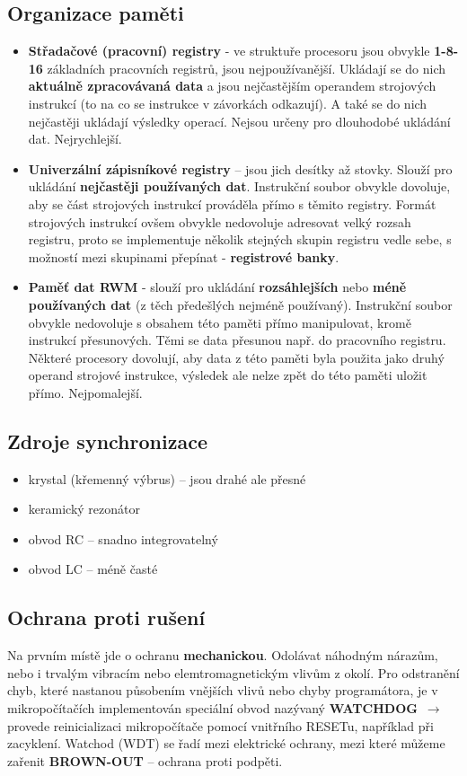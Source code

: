 \subsection*{Organizace paměti}
\begin{itemize}
	\item \textbf{Střadačové (pracovní) registry }- ve struktuře procesoru jsou obvykle \textbf{1-8-16} základních pracovních registrů, jsou nejpoužívanější. Ukládají se do nich \textbf{aktuálně zpracovávaná data} a jsou nejčastějším operandem strojových instrukcí (to na co se instrukce v závorkách odkazují). A také se do nich nejčastěji ukládají výsledky operací. Nejsou určeny pro dlouhodobé ukládání dat. Nejrychlejší.
	\item \textbf{Univerzální zápisníkové registry} – jsou jich desítky až stovky. Slouží pro ukládání \textbf{nejčastěji používaných dat}. Instrukční soubor obvykle dovoluje, aby se část strojových instrukcí prováděla přímo s těmito registry. Formát strojových instrukcí ovšem obvykle nedovoluje adresovat velký rozsah registru, proto se implementuje několik stejných skupin registru vedle sebe, s možností mezi skupinami přepínat - \textbf{registrové banky}.
	\item \textbf{Paměť dat RWM }- slouží pro ukládání \textbf{rozsáhlejších} nebo \textbf{méně používaných dat} (z těch předešlých nejméně používaný). Instrukční soubor obvykle nedovoluje s obsahem této paměti přímo manipulovat, kromě instrukcí přesunových. Těmi se data přesunou např. do pracovního registru. Některé procesory dovolují, aby data z této paměti byla použita jako druhý operand strojové instrukce, výsledek ale nelze zpět do této paměti uložit přímo. Nejpomalejší.
\end{itemize}

\subsection*{Zdroje synchronizace}
\begin{itemize}
	\item krystal (křemenný výbrus) – jsou drahé ale přesné
	\item keramický rezonátor
	\item obvod RC – snadno integrovatelný
	\item obvod LC – méně časté
\end{itemize}

\subsection*{Ochrana proti rušení}
Na prvním místě jde o ochranu \textbf{mechanickou}. Odolávat náhodným nárazům, nebo i trvalým vibracím nebo elemtromagnetickým vlivům z okolí. Pro odstranění chyb, které nastanou působením vnějších vlivů nebo chyby programátora, je v mikropočítačích implementován speciální obvod nazývaný \textbf{WATCHDOG} $\,\to\,$ provede reinicializaci mikropočítače pomocí vnitřního RESETu, například při zacyklení. Watchod (WDT) se řadí mezi elektrické ochrany, mezi které můžeme zařenit \textbf{BROWN-OUT} -- ochrana proti podpěti.

